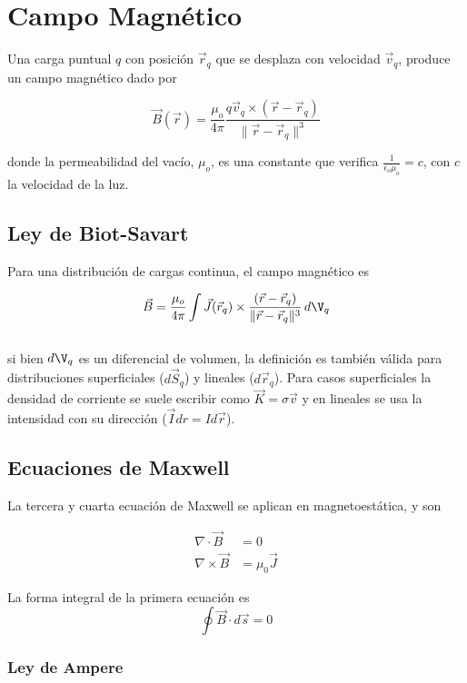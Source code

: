 \section{Campo Magnético}

Una carga puntual $q$ con posición $\Vec{r}_q$ que se desplaza con velocidad $\Vec{v}_q$, produce un campo magnético dado por

\[\Vec{B}(\Vec{r})=\frac{\mu_o}{4\pi}
\frac{q\Vec{v}_q\times(\Vec{r}-\Vec{r}_q)}{\|\Vec{r}-\Vec{r}_q\|^3}\]

donde la permeabilidad del vacío, $\mu_o$, es una constante que verifica $\frac{1}{\epsilon_o\mu_o}=c$, con $c$ la velocidad de la luz.

\subsection{Ley de Biot-Savart}

Para una distribución de cargas continua, el campo magnético es

\[\Vec{B}=\frac{\mu_o}{4\pi}\int\Vec{J}(\Vec{r}_q)\times
\frac{(\Vec{r}-\Vec{r}_q)}{\|\Vec{r}-\Vec{r}_q\|^3}\,d\V_q\]\\
si bien $d\V_q$ es un diferencial de volumen, la definición es también válida para distribuciones superficiales ($d\Vec{S}_q$) y lineales ($d\Vec{r}_q$). Para casos superficiales la densidad de corriente se suele escribir como $\Vec{K} = \sigma \vec{v}$ y en lineales se usa la intensidad con su dirección ($\Vec{I}dr = Id\Vec{r}$).

\subsection{Ecuaciones de Maxwell}

La tercera y cuarta ecuación de Maxwell se aplican en magnetoestática, y son

\begin{equation}
\begin{split}
   \nabla\cdot \Vec{B} &= 0\\
    \nabla \times \Vec{B} &= \mu_0\Vec{J}
\end{split}
\nonumber
\end{equation}

La forma integral de la primera ecuación es
\[ \oint\Vec{B}\cdot d\vec{s} = 0 \]

\subsubsection{Ley de Ampere}


